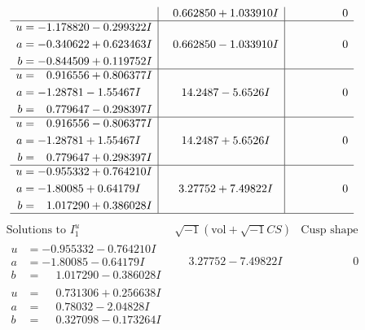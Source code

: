 \documentclass[1p]{elsarticle_modified}
\theoremstyle{definition}
\newcommand{\I}{\sqrt{-1}}
\begin{document}
$$\begin{array}{c|c|c}
 & \phantom{-}0.662850 + 1.033910 I & \phantom{-0.000000 } 0 \\ \hline\begin{aligned}
u &= -1.178820 - 0.299322 I \\
a &= -0.340622 + 0.623463 I \\
b &= -0.844509 + 0.119752 I\end{aligned}
 & \phantom{-}0.662850 - 1.033910 I & \phantom{-0.000000 } 0 \\ \hline\begin{aligned}
u &= \phantom{-}0.916556 + 0.806377 I \\
a &= -1.28781 - 1.55467 I \\
b &= \phantom{-}0.779647 - 0.298397 I\end{aligned}
 & \phantom{-}14.2487 - 5.6526 I & \phantom{-0.000000 } 0 \\ \hline\begin{aligned}
u &= \phantom{-}0.916556 - 0.806377 I \\
a &= -1.28781 + 1.55467 I \\
b &= \phantom{-}0.779647 + 0.298397 I\end{aligned}
 & \phantom{-}14.2487 + 5.6526 I & \phantom{-0.000000 } 0 \\ \hline\begin{aligned}
u &= -0.955332 + 0.764210 I \\
a &= -1.80085 + 0.64179 I \\
b &= \phantom{-}1.017290 + 0.386028 I\end{aligned}
 & \phantom{-}3.27752 + 7.49822 I & \phantom{-0.000000 } 0\\
 \hline 
 \end{array}$$\newpage$$\begin{array}{c|c|c}  
\text{Solutions to }I^u_{1}& \I (\text{vol} + \sqrt{-1}CS) & \text{Cusp shape}\\
 \hline 
\begin{aligned}
u &= -0.955332 - 0.764210 I \\
a &= -1.80085 - 0.64179 I \\
b &= \phantom{-}1.017290 - 0.386028 I\end{aligned}
 & \phantom{-}3.27752 - 7.49822 I & \phantom{-0.000000 } 0 \\ \hline\begin{aligned}
u &= \phantom{-}0.731306 + 0.256638 I \\
a &= \phantom{-}0.78032 - 2.04828 I \\
b &= \phantom{-}0.327098 - 0.173264 I\end{aligned}

\end{array}$$
\end{document}
